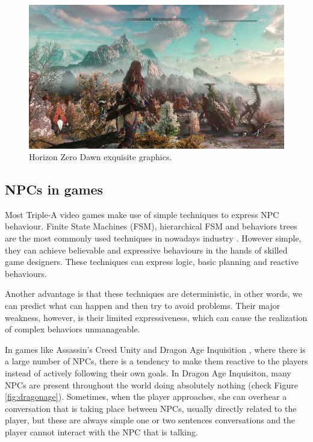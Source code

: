 \begin{figure}
  \centering
  \includegraphics[width=\textwidth]{./Images/horizon-zero-dawn}
  \caption{Horizon Zero Dawn exquisite graphics.}
  \label{fig:horizon}
\end{figure}

\subsection{NPCs in games}

Most Triple-A video games make use of simple techniques to express \ac{NPC} behaviour.
Finite State Machines (FSM), hierarchical FSM and behaviors trees are the most commonly used techniques in nowadays industry \cite{yannakakis:gameairevisited}.
However simple, they can achieve believable and expressive behaviours in the hands of skilled game designers.
These techniques can express logic, basic planning and reactive behaviours.

Another advantage is that these techniques are deterministic, in other words, we can predict what can happen and then try to avoid problems.
Their major weakness, however, is their limited expressiveness, which can cause the realization of complex behaviors unmanageable.

In games like Assassin's Creed Unity \cite{games:assassinscreedunity} and Dragon Age Inquisition \cite{games:dragonageinquisition}, where there is a large number of \acp{NPC}, there is a tendency to make them reactive to the players instead of actively following their own goals.
In Dragon Age Inquisiton, many \acp{NPC} are present throughout the world doing absolutely nothing (check Figure \ref{fig:dragonage}).
Sometimes, when the player approaches, she can overhear a conversation that is taking place between \acp{NPC}, usually directly related to the player, but these are always simple one or two sentences conversations and the player cannot interact with the \ac{NPC} that is talking.

